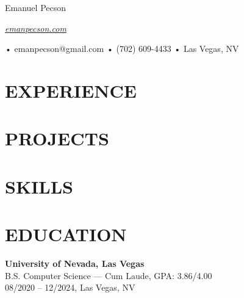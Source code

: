 \documentclass[letterpaper,10pt]{article}
\newcommand{\customhref}[2]{%
  \href{#1}{{\robotoregular\fontsize{10}{12}\selectfont\color[HTML]{4B88E9}\textit{#2}}}%
}
\begin{document}
\begin{center}
  {\fontsize{20}{20}\robotoregular Emanuel Pecson} \\

	\vspace{0.5em}

	\customhref{https://emanpecson.com}{emanpecson.com}	
	\hspace{0.6em}•\hspace{0.6em}
	emanpecson@gmail.com
	\hspace{0.6em}•\hspace{0.6em}
	(702) 609-4433
	\hspace{0.6em}•\hspace{0.6em}
	Las Vegas, NV
\end{center}

\vspace{0.5em}

\section*{EXPERIENCE}




\section*{PROJECTS}



\section*{SKILLS}


\section*{EDUCATION}
\textbf{University of Nevada, Las Vegas} \\
B.S. Computer Science — \textnormal{Cum Laude}, GPA: 3.86/4.00 \\
08/2020 – 12/2024, Las Vegas, NV
\end{document}
